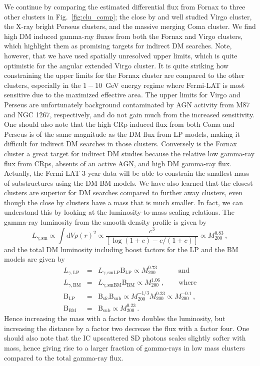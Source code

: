 \documentclass[10pt,aps,pra,reprint,amsmath,amsfonts,amssymb,showpacs,nofootinbib,floatfix]{revtex4-1}
\def\del#1{{}}
\newcommand{\rmn}{\mathrm}
\newcommand{\sfe}{\rmn{sfe}}
\newcommand{\sub}{\rmn{sub}}
\newcommand{\B}{\rmn{B}}
\newcommand{\sm}{\rmn{sm}}
\newcommand{\dd}{\rmn{d}}
\newcommand{\mvir}{M_{200}}
\begin{document}
We continue by comparing the estimated differential flux from Fornax
to three other clusters in Fig.~\ref{fig:clu_comp}; the close by and
well studied Virgo cluster, the X-ray bright Perseus clusters, and the
massive merging Coma cluster. We find high DM induced gamma-ray fluxes
from both the Fornax and Virgo clusters, which highlight them as
promising targets for indirect DM searches. Note, however, that we
have used spatially unresolved upper limits, which is quite optimistic
for the angular extended Virgo cluster. It is quite striking how
constraining the upper limits for the Fornax cluster are compared to
the other clusters, especially in the $1-10$~GeV energy regime where
Fermi-LAT is most sensitive due to the maximized effective area. The
upper limits for Virgo and Perseus are unfortunately background
contaminated by AGN activity from M87 and NGC 1267, respectively, and
do not gain much from the increased sensitivity. One should also note
that the high CRp induced flux from both Coma and Perseus is of the
same magnitude as the DM flux from LP models, making it difficult for
indirect DM searches in those clusters. Conversely is the Fornax
cluster a great target for indirect DM studies because the relative
low gamma-ray flux from CRps, absents of an active AGN, and high DM
gamma-ray flux. Actually, the Fermi-LAT 3 year data will be able to
constrain the smallest mass of substructures using the DM BM
models. We have also learned that the closest clusters are superior
for DM searches compared to further away clusters, even though the
close by clusters have a mass that is much smaller. In fact, we can
understand this by looking at the luminosity-to-mass scaling
relations. The gamma-ray luminosity from the smooth density profile is
given by \cite{2009PhRvL.103r1302P}
\begin{equation}
L_{\gamma,\sm} \propto \int \dd V \rho(r)^2 \propto \frac{c^3}
{\left[\log\left(1+c\right)-c/(1+c)\right]} \propto \mvir^{0.83}\,,
\end{equation}
and the total DM luminosity including boost factors for the LP and
the BM models are given by
\begin{eqnarray}
\label{eq:LP_scaling}
L_{\gamma,\rmn{LP}} &=& L_{\gamma,\rmn{smLP}} \B_\rmn{LP} \propto \mvir^{0.73}\qquad
\,\,\,\,\,\,\rmn{and}\\
\label{eq:BM_scaling}
L_{\gamma,\rmn{BM}} &=& L_{\gamma,\rmn{smBM}} \B_\rmn{BM} \propto  \mvir^{1.06}\,,\qquad
\rmn{where} \\
\B_\rmn{LP}&=&\B_\sfe \B_\sub \propto \mvir^{-1/3}\mvir^{0.23} \propto
 \mvir^{-0.1}\,,\\
\B_\rmn{BM}&=&\B_\sub \propto \mvir^{0.23}\,.
\end{eqnarray}
Hence increasing the mass with a factor two doubles the luminosity,
but increasing the distance by a factor two decrease the flux with a
factor four. One should also note that the IC upscattered SD photons
scales slightly softer with mass, hence giving rise to a larger
fraction of gamma-rays in low mass clusters compared to the total
gamma-ray flux. \del{Furthermore, the low mass clusters have a higher flux
from IC upscattered SD photons than high mass clusters which increase
the importance of the SD component in low mass clusters even more
(c.f. Fig.~\ref{fig:IR_comp}).}
\end{document}
